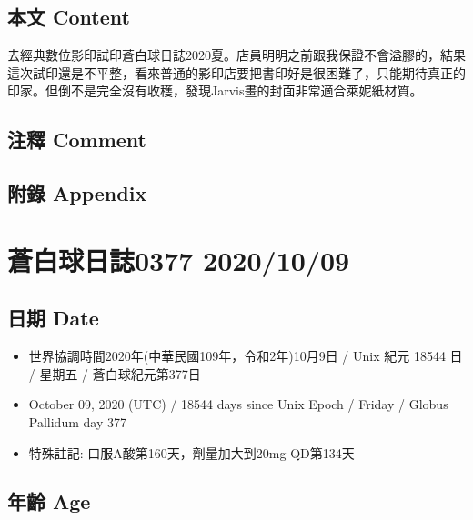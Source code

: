 \documentclass[
]{article}
\providecommand{\tightlist}{%
  \setlength{\itemsep}{0pt}\setlength{\parskip}{0pt}}
\begin{document}
\hypertarget{ux672cux6587-content-35}{%
\subsection{本文 Content}\label{ux672cux6587-content-35}}

去經典數位影印試印蒼白球日誌2020夏。店員明明之前跟我保證不會溢膠的，結果這次試印還是不平整，看來普通的影印店要把書印好是很困難了，只能期待真正的印家。但倒不是完全沒有收穫，發現Jarvis畫的封面非常適合萊妮紙材質。

\hypertarget{ux6ce8ux91cb-comment-35}{%
\subsection{注釋 Comment}\label{ux6ce8ux91cb-comment-35}}

\hypertarget{ux9644ux9304-appendix-35}{%
\subsection{附錄 Appendix}\label{ux9644ux9304-appendix-35}}

\hypertarget{ux84bcux767dux7403ux65e5ux8a8c0377-20201009}{%
\section{蒼白球日誌0377
2020/10/09}\label{ux84bcux767dux7403ux65e5ux8a8c0377-20201009}}

\hypertarget{ux65e5ux671f-date-36}{%
\subsection{日期 Date}\label{ux65e5ux671f-date-36}}

\begin{itemize}
\tightlist
\item
  世界協調時間2020年(中華民國109年，令和2年)10月9日 / Unix 紀元 18544 日
  / 星期五 / 蒼白球紀元第377日
\item
  October 09, 2020 (UTC) / 18544 days since Unix Epoch / Friday / Globus
  Pallidum day 377
\item
  特殊註記: 口服A酸第160天，劑量加大到20mg QD第134天
\end{itemize}

\hypertarget{ux5e74ux9f61-age-36}{%
\subsection{年齡 Age}\label{ux5e74ux9f61-age-36}}
\end{document}
